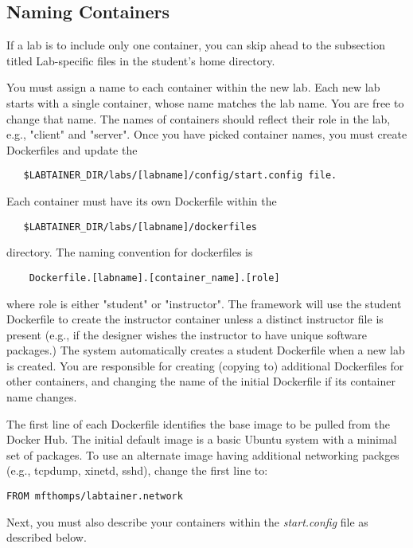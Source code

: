 \documentclass[12pt]{article}
\begin{document}
\subsection {Naming Containers}
If a lab is to include only one container, you can
skip ahead to the subsection titled Lab-specific files in the student's home directory.

You must assign a name to each container within the new lab.  Each new lab
starts with a single container, whose name matches the lab name.  You are free
to change that name. The names of containers should reflect their role in the lab,
e.g., "client" and "server".  Once you have picked container names, you must create
Dockerfiles and update the 
\begin{verbatim}
   $LABTAINER_DIR/labs/[labname]/config/start.config file.

\end{verbatim}
\noindent Each container must have its own Dockerfile within the 
\begin{verbatim}
   $LABTAINER_DIR/labs/[labname]/dockerfiles
\end{verbatim}
\noindent directory.  The naming convention for dockerfiles is
\begin{verbatim}
    Dockerfile.[labname].[container_name].[role]
\end{verbatim}
where role is either "student" or "instructor".  The framework will use the student Dockerfile to
create the instructor container unless a distinct instructor file is present (e.g., if the designer
wishes the instructor to have unique software packages.) The system automatically creates a student Dockerfile
when a new lab is created.  You are responsible for creating (copying to) additional Dockerfiles for other containers,
and changing the name of the initial Dockerfile if its container name changes.

The first line of each Dockerfile identifies the base image to be pulled from the Docker Hub.
The initial default image is a basic Ubuntu system with a minimal set of packages.  To use an
alternate image having additional networking packges (e.g., tcpdump, xinetd, sshd), change the first line to:
\begin{verbatim}
FROM mfthomps/labtainer.network
\end{verbatim}

Next, you must also describe your containers within the \textit{start.config} file as described below.
\end{document}
